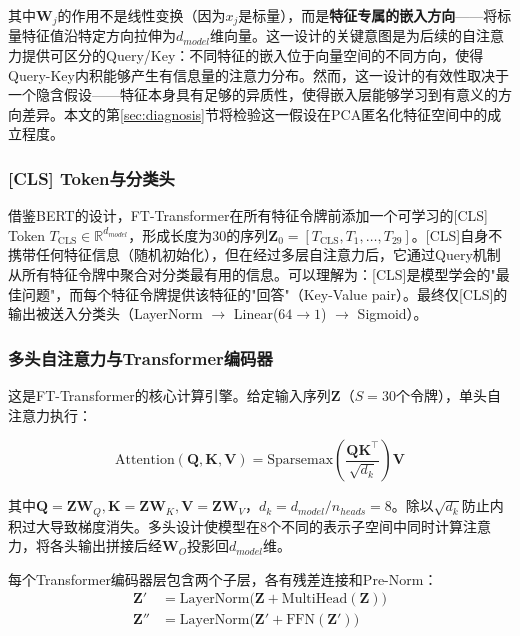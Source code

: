 其中$\bm{W}_j$的作用不是线性变换（因为$x_j$是标量），而是\textbf{特征专属的嵌入方向}——将标量特征值沿特定方向拉伸为$d_{model}$维向量。这一设计的关键意图是为后续的自注意力提供可区分的Query/Key：不同特征的嵌入位于向量空间的不同方向，使得Query-Key内积能够产生有信息量的注意力分布。然而，这一设计的有效性取决于一个隐含假设——特征本身具有足够的异质性，使得嵌入层能够学习到有意义的方向差异。本文的第\ref{sec:diagnosis}节将检验这一假设在PCA匿名化特征空间中的成立程度。

\subsubsection{[CLS] Token与分类头}

借鉴BERT\cite{devlin2018bert}的设计，FT-Transformer在所有特征令牌前添加一个可学习的[CLS] Token $T_{\mathrm{CLS}} \in \mathbb{R}^{d_{model}}$，形成长度为30的序列$\mathbf{Z}_0 = [T_{\mathrm{CLS}}, T_1, \dots, T_{29}]$。[CLS]自身不携带任何特征信息（随机初始化），但在经过多层自注意力后，它通过Query机制从所有特征令牌中聚合对分类最有用的信息。可以理解为：[CLS]是模型学会的"最佳问题"，而每个特征令牌提供该特征的"回答"（Key-Value pair）。最终仅[CLS]的输出被送入分类头（LayerNorm $\to$ Linear($64{\to}1$) $\to$ Sigmoid）。

\subsubsection{多头自注意力与Transformer编码器}

这是FT-Transformer的核心计算引擎。给定输入序列$\mathbf{Z}$（$S=30$个令牌），单头自注意力执行：

\begin{equation}
\mathrm{Attention}(\mathbf{Q}, \mathbf{K}, \mathbf{V}) = \mathrm{Sparsemax}\!\left(\frac{\mathbf{Q}\mathbf{K}^\top}{\sqrt{d_k}}\right) \mathbf{V}
\label{eq:attention}
\end{equation}

其中$\mathbf{Q} = \mathbf{Z}\mathbf{W}_Q, \mathbf{K} = \mathbf{Z}\mathbf{W}_K, \mathbf{V} = \mathbf{Z}\mathbf{W}_V$，$d_k = d_{model} / n_{heads} = 8$。除以$\sqrt{d_k}$防止内积过大导致梯度消失。多头设计使模型在8个不同的表示子空间中同时计算注意力，将各头输出拼接后经$\mathbf{W}_O$投影回$d_{model}$维。

每个Transformer编码器层包含两个子层，各有残差连接和Pre-Norm：
\begin{equation}
\begin{aligned}
\mathbf{Z}' &= \mathrm{LayerNorm}\big(\mathbf{Z} + \mathrm{MultiHead}(\mathbf{Z})\big) \\
\mathbf{Z}'' &= \mathrm{LayerNorm}\big(\mathbf{Z}' + \mathrm{FFN}(\mathbf{Z}')\big)
\end{aligned}
\end{equation}

